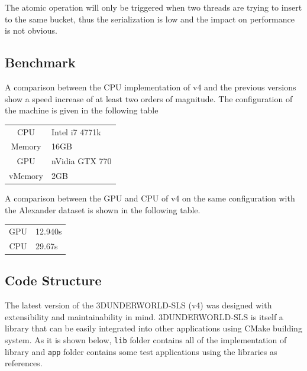 \documentclass[final,12pt,3p]{elsarticle}
\begin{document}
The atomic operation will only be triggered when two threads are trying to insert to the same bucket, thus the serialization is low and the impact on
performance is not obvious.

\subsection{Benchmark}\label{benchmark}
A comparison between the CPU implementation of v4 and the previous versions show a speed increase of at least two orders of magnitude. The configuration of the machine is given in the
following table

\begin{center}
\begin{tabular}{cl}
\hline
CPU     &   Intel i7 4771k\\
Memory  &   16GB    \\
GPU     &   nVidia GTX 770  \\
vMemory &   2GB \\
\hline
\end{tabular}
\end{center}

A comparison between the GPU and CPU of v4 on the same configuration with the Alexander dataset is shown in the following table.

\begin{center}
\begin{tabular}{cl}
\hline
GPU     &   12.940s\\
CPU     &   29.67s\\
\hline
\end{tabular}
\end{center}

\subsection{Code Structure}\label{code-structure}

The latest version of the 3DUNDERWORLD-SLS (v4) was designed with extensibility and maintainability in mind. 3DUNDERWORLD-SLS is itself a library that can be easily integrated into other applications using CMake building system. As it is shown below,
\texttt{lib} folder contains all of the implementation of library and
\texttt{app} folder contains some test applications using the libraries
as references.
\end{document}
